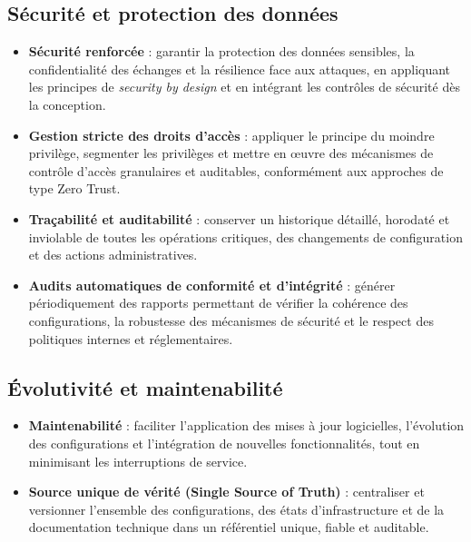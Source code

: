 \subsection*{Sécurité et protection des données}

\begin{itemize}
	\item \textbf{Sécurité renforcée} : garantir la protection des données sensibles, la confidentialité des échanges et la résilience face aux attaques, en appliquant les principes de \emph{security by design} et en intégrant les contrôles de sécurité dès la conception.

	\item \textbf{Gestion stricte des droits d'accès} : appliquer le principe du moindre privilège, segmenter les privilèges et mettre en œuvre des mécanismes de contrôle d'accès granulaires et auditables, conformément aux approches de type Zero Trust.

	\item \textbf{Traçabilité et auditabilité} : conserver un historique détaillé, horodaté et inviolable de toutes les opérations critiques, des changements de configuration et des actions administratives.

	\item \textbf{Audits automatiques de conformité et d'intégrité} : générer périodiquement des rapports permettant de vérifier la cohérence des configurations, la robustesse des mécanismes de sécurité et le respect des politiques internes et réglementaires.
\end{itemize}

\subsection*{Évolutivité et maintenabilité}

\begin{itemize}
	\item \textbf{Maintenabilité} : faciliter l'application des mises à jour logicielles, l'évolution des configurations et l'intégration de nouvelles fonctionnalités, tout en minimisant les interruptions de service.

	\item \textbf{Source unique de vérité (Single Source of Truth)} : centraliser et versionner l'ensemble des configurations, des états d'infrastructure et de la documentation technique dans un référentiel unique, fiable et auditable.
\end{itemize}

